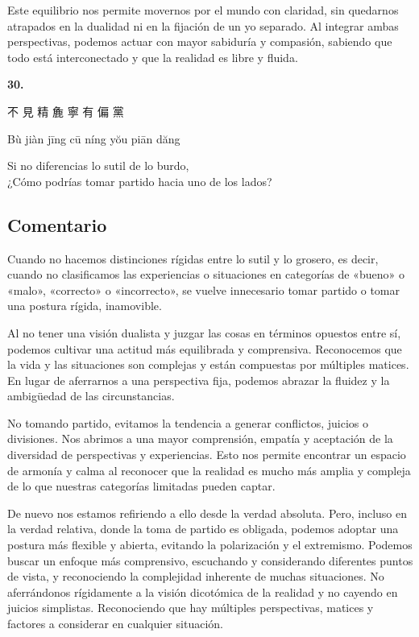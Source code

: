 \documentclass[
  a5paperpaper,
]{article}
\begin{document}
Este equilibrio nos permite movernos por el mundo con claridad, sin
quedarnos atrapados en la dualidad ni en la fijación de un yo separado.
Al integrar ambas perspectivas, podemos actuar con mayor sabiduría y
compasión, sabiendo que todo está interconectado y que la realidad es
libre y fluida.

\hfill\break

\hypertarget{05}{}
\begin{verseblock}

\newpage

\begin{center}\textbf{30.}\end{center}

不 見 精 麁 寧 有 偏 黨

Bù jiàn jīng cū níng yŏu piān dăng

Si no diferencias lo sutil de lo burdo,\\
¿Cómo podrías tomar partido hacia uno de los lados?

\end{verseblock}

\hfill\break

\hypertarget{comentario-29}{%
\subsection{Comentario}\label{comentario-29}}

Cuando no hacemos distinciones rígidas entre lo sutil y lo grosero, es
decir, cuando no clasificamos las experiencias o situaciones en
categorías de «bueno» o «malo», «correcto» o «incorrecto», se vuelve
innecesario tomar partido o tomar una postura rígida, inamovible.

Al no tener una visión dualista y juzgar las cosas en términos opuestos
entre sí, podemos cultivar una actitud más equilibrada y comprensiva.
Reconocemos que la vida y las situaciones son complejas y están
compuestas por múltiples matices. En lugar de aferrarnos a una
perspectiva fija, podemos abrazar la fluidez y la ambigüedad de las
circunstancias.

No tomando partido, evitamos la tendencia a generar conflictos, juicios
o divisiones. Nos abrimos a una mayor comprensión, empatía y aceptación
de la diversidad de perspectivas y experiencias. Esto nos permite
encontrar un espacio de armonía y calma al reconocer que la realidad es
mucho más amplia y compleja de lo que nuestras categorías limitadas
pueden captar.

De nuevo nos estamos refiriendo a ello desde la verdad absoluta. Pero,
incluso en la verdad relativa, donde la toma de partido es obligada,
podemos adoptar una postura más flexible y abierta, evitando la
polarización y el extremismo. Podemos buscar un enfoque más comprensivo,
escuchando y considerando diferentes puntos de vista, y reconociendo la
complejidad inherente de muchas situaciones. No aferrándonos rígidamente
a la visión dicotómica de la realidad y no cayendo en juicios
simplistas. Reconociendo que hay múltiples perspectivas, matices y
factores a considerar en cualquier situación.
\end{document}
